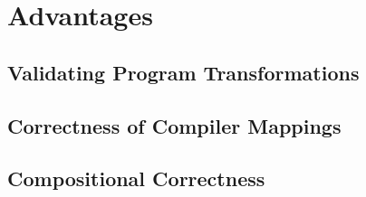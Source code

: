 \documentclass{article}
\begin{document}

    
    \section{Advantages}

        

        \subsection{Validating Program Transformations}


        \subsection{Correctness of Compiler Mappings}


        \subsection{Compositional Correctness}

\end{document}
